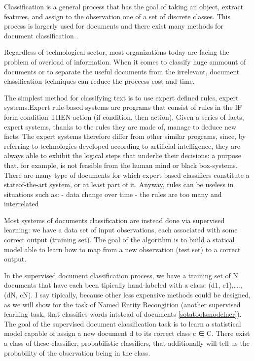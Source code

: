 \documentclass[]{book}
\begin{document}
Classification is a general process that has the goal of taking an
object, extract features, and assign to the observation one of a set of
discrete classes. This process is largerly used for documents
\citep{borko1963automatic} and there exist many methods for document
classification \citep{aggarwal2012survey}.

Regardless of technological sector, most organizations today are facing
the problem of overload of information. When it comes to classify huge
ammount of documents or to separate the useful documents from the
irrelevant, document classification techniques can reduce the proecess
cost and time.

The simplest method for classifying text is to use expert defined rules,
expert systems.Expert rule-based systems are programs that consist of
rules in the IF form condition THEN action (if condition, then action).
Given a series of facts, expert systems, thanks to the rules they are
made of, manage to deduce new facts. The expert systems therefore differ
from other similar programs, since, by referring to technologies
developed according to artificial intelligence, they are always able to
exhibit the logical steps that underlie their decisions: a purpose that,
for example, is not feasible from the human mind or black box-systems.
There are many type of documents for which expert based classifiers
constitute a stateof-the-art system, or at least part of it. Anyway,
rules can be useless in situations such as: - data change over time -
the rules are too many and interrelated

Most systems of documents classification are instead done via supervised
learning: we have a data set of input observations, each associated with
some correct output (training set). The goal of the algorithm is to
build a statical model able to learn how to map from a new observation
(test set) to a correct output.

In the supervised document classification process, we have a training
set of N documents that have each been tipically hand-labeled with a
class: (d1, c1),\ldots{}.,(dN, cN). I say tipically, because other less
expensive methods could be designed, as we will show for the task of
Named Entity Recongition (another supervised learning task, that
classifies words intstead of documents \ref{sotatoolsmodelner}). The
goal of the supervised document classification task is to learn a
statistical model capable of assign a new document d to its correct
class c ∈ C. There exist a class of these classifier, probabilistic
classifiers, that additionally will tell us the probability of the
observation being in the class.
\end{document}

